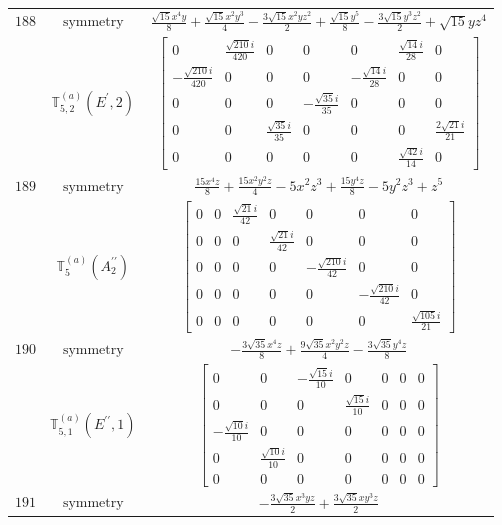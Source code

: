 \documentclass[fleqn,8pt,landscape]{jsarticle}
\begin{document}
\begin{longtable}{ccc}
$ 188 $ & $ \text{symmetry} $ & $ \frac{\sqrt{15} x^{4} y}{8} + \frac{\sqrt{15} x^{2} y^{3}}{4} - \frac{3 \sqrt{15} x^{2} y z^{2}}{2} + \frac{\sqrt{15} y^{5}}{8} - \frac{3 \sqrt{15} y^{3} z^{2}}{2} + \sqrt{15} y z^{4} $ \\
$  $ & $ \mathbb{T}_{5,2}^{(a)}(E^{\prime},2) $ & $ \begin{bmatrix} 0 & \frac{\sqrt{210} i}{420} & 0 & 0 & 0 & \frac{\sqrt{14} i}{28} & 0 \\ - \frac{\sqrt{210} i}{420} & 0 & 0 & 0 & - \frac{\sqrt{14} i}{28} & 0 & 0 \\ 0 & 0 & 0 & - \frac{\sqrt{35} i}{35} & 0 & 0 & 0 \\ 0 & 0 & \frac{\sqrt{35} i}{35} & 0 & 0 & 0 & \frac{2 \sqrt{21} i}{21} \\ 0 & 0 & 0 & 0 & 0 & \frac{\sqrt{42} i}{14} & 0 \end{bmatrix} $ \\ \hline
$ 189 $ & $ \text{symmetry} $ & $ \frac{15 x^{4} z}{8} + \frac{15 x^{2} y^{2} z}{4} - 5 x^{2} z^{3} + \frac{15 y^{4} z}{8} - 5 y^{2} z^{3} + z^{5} $ \\
$  $ & $ \mathbb{T}_{5}^{(a)}(A_{2}^{\prime\prime}) $ & $ \begin{bmatrix} 0 & 0 & \frac{\sqrt{21} i}{42} & 0 & 0 & 0 & 0 \\ 0 & 0 & 0 & \frac{\sqrt{21} i}{42} & 0 & 0 & 0 \\ 0 & 0 & 0 & 0 & - \frac{\sqrt{210} i}{42} & 0 & 0 \\ 0 & 0 & 0 & 0 & 0 & - \frac{\sqrt{210} i}{42} & 0 \\ 0 & 0 & 0 & 0 & 0 & 0 & \frac{\sqrt{105} i}{21} \end{bmatrix} $ \\ \hline
$ 190 $ & $ \text{symmetry} $ & $ - \frac{3 \sqrt{35} x^{4} z}{8} + \frac{9 \sqrt{35} x^{2} y^{2} z}{4} - \frac{3 \sqrt{35} y^{4} z}{8} $ \\
$  $ & $ \mathbb{T}_{5,1}^{(a)}(E^{\prime\prime},1) $ & $ \begin{bmatrix} 0 & 0 & - \frac{\sqrt{15} i}{10} & 0 & 0 & 0 & 0 \\ 0 & 0 & 0 & \frac{\sqrt{15} i}{10} & 0 & 0 & 0 \\ - \frac{\sqrt{10} i}{10} & 0 & 0 & 0 & 0 & 0 & 0 \\ 0 & \frac{\sqrt{10} i}{10} & 0 & 0 & 0 & 0 & 0 \\ 0 & 0 & 0 & 0 & 0 & 0 & 0 \end{bmatrix} $ \\ \hline
$ 191 $ & $ \text{symmetry} $ & $ - \frac{3 \sqrt{35} x^{3} y z}{2} + \frac{3 \sqrt{35} x y^{3} z}{2} $ \\

\end{longtable}
\end{document}
